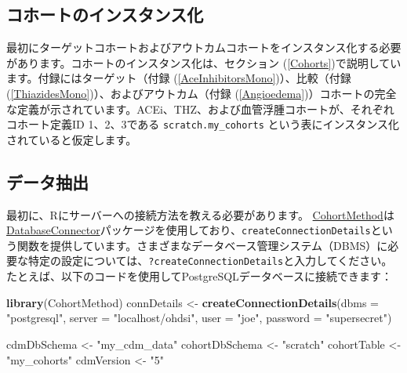 \documentclass[
  11pt]{book}
\newenvironment{Shaded}{\begin{snugshade}}{\end{snugshade}}
\newcommand{\AttributeTok}[1]{\textcolor[rgb]{0.13,0.29,0.53}{#1}}
\newcommand{\FunctionTok}[1]{\textcolor[rgb]{0.13,0.29,0.53}{\textbf{#1}}}
\newcommand{\NormalTok}[1]{#1}
\newcommand{\OtherTok}[1]{\textcolor[rgb]{0.56,0.35,0.01}{#1}}
\newcommand{\StringTok}[1]{\textcolor[rgb]{0.31,0.60,0.02}{#1}}
\theoremstyle{definition}
\theoremstyle{definition}
\theoremstyle{definition}
\theoremstyle{definition}
\theoremstyle{remark}
\begin{document}
\subsection{コホートのインスタンス化}\label{ux30b3ux30dbux30fcux30c8ux306eux30a4ux30f3ux30b9ux30bfux30f3ux30b9ux5316-1}

最初にターゲットコホートおよびアウトカムコホートをインスタンス化する必要があります。コホートのインスタンス化は、セクション (\ref{Cohorts})で説明しています。付録にはターゲット（付録 (\ref{AceInhibitorsMono})）、比較（付録 (\ref{ThiazidesMono})）、およびアウトカム（付録 (\ref{Angioedema})）コホートの完全な定義が示されています。ACEi、THZ、および血管浮腫コホートが、それぞれコホート定義ID 1、2、3である \texttt{scratch.my\_cohorts} という表にインスタンス化されていると仮定します。

\subsection{データ抽出}\label{ux30c7ux30fcux30bfux62bdux51fa-1}

最初に、Rにサーバーへの接続方法を教える必要があります。 \href{https://ohdsi.github.io/CohortMethod/}{CohortMethod}は\href{https://ohdsi.github.io/DatabaseConnector/}{DatabaseConnector}パッケージを使用しており、\texttt{createConnectionDetails}という関数を提供しています。さまざまなデータベース管理システム（DBMS）に必要な特定の設定については、\texttt{?createConnectionDetails}と入力してください。たとえば、以下のコードを使用してPostgreSQLデータベースに接続できます：

\begin{Shaded}
\begin{Highlighting}[]
\FunctionTok{library}\NormalTok{(CohortMethod)}
\NormalTok{connDetails }\OtherTok{\textless{}{-}} \FunctionTok{createConnectionDetails}\NormalTok{(}\AttributeTok{dbms =} \StringTok{"postgresql"}\NormalTok{,}
                                       \AttributeTok{server =} \StringTok{"localhost/ohdsi"}\NormalTok{,}
                                       \AttributeTok{user =} \StringTok{"joe"}\NormalTok{,}
                                       \AttributeTok{password =} \StringTok{"supersecret"}\NormalTok{)}

\NormalTok{cdmDbSchema }\OtherTok{\textless{}{-}} \StringTok{"my\_cdm\_data"}
\NormalTok{cohortDbSchema }\OtherTok{\textless{}{-}} \StringTok{"scratch"}
\NormalTok{cohortTable }\OtherTok{\textless{}{-}} \StringTok{"my\_cohorts"}
\NormalTok{cdmVersion }\OtherTok{\textless{}{-}} \StringTok{"5"}
\end{Highlighting}
\end{Shaded}
\end{document}
